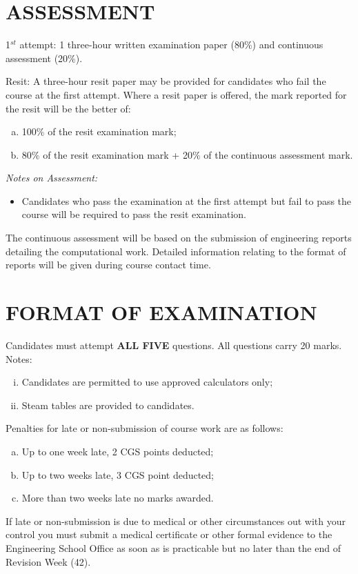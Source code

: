 \documentclass[12pts,a4paper,amsmath,amssymb,floatfix]{article}%
\begin{document}
\section{ASSESSMENT}
1$^{st}$ attempt: 1 three-hour written examination paper (80$\%$) and continuous assessment (20$\%$). 
\medskip

Resit: A three-hour resit paper may be provided for candidates who fail the course at the first attempt. Where a resit paper is offered, the mark reported for the resit will be the better of:
\begin{enumerate}[(a)]
  \item 100$\%$ of the resit examination mark;
  \item 80$\%$ of the resit examination mark + 20$\%$ of the continuous assessment mark.
\end{enumerate}
\medskip

{\it Notes on Assessment:
\begin{itemize}
\item Candidates who pass the examination at the first attempt but fail to pass the course will be required to pass the resit examination.
\end{itemize}}

\medskip

The continuous assessment will be based on the submission of engineering reports detailing the computational work. Detailed information relating to the format of reports will be given during course contact time.


\section{FORMAT OF EXAMINATION}
Candidates must attempt {\bf ALL FIVE} questions. All questions carry 20 marks. Notes:
\begin{enumerate}[(i)]
\item Candidates are permitted to use approved calculators only;
\item Steam  tables are provided to candidates.
\end{enumerate}

\medskip

Penalties for late or non-submission of course work are as follows:
\begin{enumerate}[(a)]
\item Up to one week late, 2 CGS points deducted;
\item Up to two weeks late, 3 CGS point deducted;
\item More than two weeks late no marks awarded.
\end{enumerate}
If late or non-submission is due to medical or other circumstances out with your control you must submit a medical certificate or other formal evidence to the Engineering School Office as soon as is practicable but no later than the end of Revision Week (42).
\end{document}
